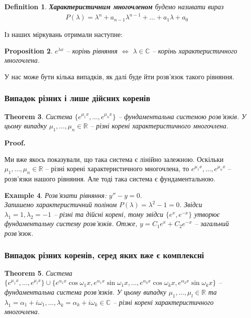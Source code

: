 \documentclass[a4paper, 10pt]{article}
\makeatletter
\def\qed{$\blacksquare$}
\theoremstyle{theoremdd}
\newtheorem{theorem}{Theorem}[subsection]
\theoremstyle{theoremdd}
\newtheorem{definition}[theorem]{Definition}
\theoremstyle{theoremdd}
\theoremstyle{theoremdd}
\newtheorem{example}[theorem]{Example}
\theoremstyle{theoremdd}
\newtheorem{proposition}[theorem]{Proposition}
\theoremstyle{theoremdd}
\theoremstyle{theoremdd}
\theoremstyle{theoremdd}
\renewenvironment{proof}[1][Proof.\\]{\par
\pushQED{\hfill \qed}%
\normalfont \topsep6\p@\@plus6\p@\relax
\trivlist
\item\relax
{\bfseries
#1\@addpunct{.}}\hspace\labelsep\ignorespaces
}{%
\popQED\endtrivlist\@endpefalse
}
\makeatother
\begin{document}
\begin{definition}
\textbf{Характеристичним многочленом} будемо називати вираз
\begin{align*}
P(\lambda) = \lambda^n + a_{n-1} \lambda^{n-1} + \dots + a_1 \lambda + a_0
\end{align*}
\end{definition}

Із наших міркувань отримали наступне:
	\begin{proposition}
 $\displaystyle e^{\lambda x}$ -- корінь рівняння $\iff$ $\lambda \in \mathbb{C}$ -- корінь характеристичного многочлена.
	\end{proposition}
	
У нас може бути кілька випадків, як далі буде йти розв'язок такого рівняння.

\subsubsection{Випадок різних і лише дійсних коренів}
\begin{theorem}
 Система $\displaystyle \{e^{\mu_1 x}, \dots, e^{\mu_n x}\}$ -- фундаментальна системою розв'язків. У цьому випадку $\mu_1, \dots, \mu_n \in \mathbb{R}$ -- різні корені характеристичного многочлена.
\end{theorem}

\begin{proof}
Ми вже якось показували, що така система є лінійно залежною. Оскільки $\mu_1, \dots, \mu_n \in \mathbb{R}$ -- різні корені характеристичного многочлена, то $e^{\mu_1 x}, \dots, e^{\mu_n x}$ -- розв'язки нашого рівняння. Але тоді така система є фундаментальною.
\end{proof}

\begin{example}
Розв'язати рівняння: $y'' - y = 0$.\\
Запишемо характеристичний поліном $P(\lambda) = \lambda^2 - 1 = 0$. Звідси $\lambda_1 = 1, \lambda_2 = -1$ -- різні та дійсні корені, тому звідси $\{e^x,e^{-x}\}$ утворює фундаментальну систему розв'язків. Отже, $y = C_1e^x + C_2e^{-x}$ -- загальний розв'язок.
\end{example}

\subsubsection{Випадок різних коренів, серед яких вже є комплексні}
\begin{theorem}
Система $\displaystyle \{e^{\mu_1 x}, \dots, e^{\mu_l x}\} \cup \{e^{\alpha_1 x} \cos \omega_1 x, e^{\alpha_1 x} \sin \omega_1 x, \dots, e^{\alpha_k x} \cos \omega_k x, e^{\alpha_k x} \sin \omega_k x\}$ -- фундаментальна система розв'язків. У цьому випадку $\mu_1, \dots, \mu_l \in \mathbb{R}$ та $\lambda_1 = \alpha_1 + i\omega_1, \dots, \lambda_k = \alpha_k + i\omega_k \in \mathbb{C}$ -- різні корені характеристичного многочлена.
\end{theorem}
\end{document}
